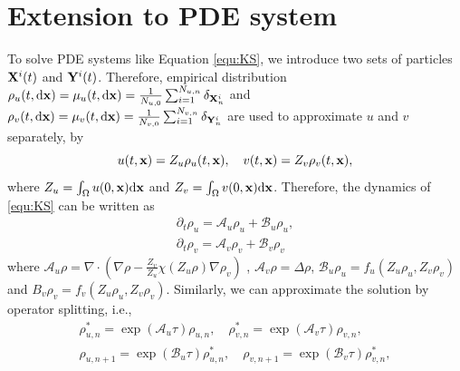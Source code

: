 \documentclass[a4paper,fleqn]{cas-sc}
\theoremstyle{definition}
\theoremstyle{remark}
\begin{document}
\section{Extension to PDE system}
\label{sec:extension}
To solve PDE systems like Equation \eqref{equ:KS}, we introduce two sets of particles $\mathbf{X}^i(t)$ and $\mathbf{Y}^i(t)$. Therefore, empirical distribution $\rho_u(t,\mathrm{d} \mathbf{x} ) = \mu_u(t,\mathrm{d} \mathbf{x}) =  \frac{1}{N_{u,0}}\sum_{i=1}^{N_{u,n}}\delta_{\mathbf{X}^i_n} $ and $\rho_v(t,\mathrm{d} \mathbf{x} ) = \mu_v(t,\mathrm{d} \mathbf{x}) =  \frac{1}{N_{v,0}}\sum_{i=1}^{N_{v,n}}\delta_{\mathbf{Y}^i_n}$ are used to approximate $u$ and $v$ separately, by 
\begin{equation}
    u(t,\mathbf{x}) =  Z_u \rho_u(t,\mathbf{x}), \quad v(t,\mathbf{x}) =  Z_v \rho_v(t,\mathbf{x}),
\end{equation}
where $Z_u = \int_\Omega u(0,\mathbf{x}) \mathrm{d} \mathbf{x}$ and $Z_v = \int_\Omega v(0,\mathbf{x}) \mathrm{d} \mathbf{x}$. Therefore, the dynamics of \eqref{equ:KS} can be written as 
\begin{equation}
    \begin{aligned}
        \partial_t \rho_u =  \mathcal A_u \rho_u + \mathcal B_u \rho_u,\\
        \partial_t \rho_v =  \mathcal A_v \rho_v + \mathcal B_v \rho_v
    \end{aligned}
\end{equation}
where $\mathcal A_u \rho = \nabla \cdot ( \nabla \rho - \frac{Z_v}{Z_u} \chi(Z_u\rho) \nabla \rho_v)$ , $\mathcal A_v \rho = \Delta \rho$, $\mathcal B_u \rho_u  = f_u(Z_u\rho_u,Z_v \rho_v)$ and $B_v \rho_v = f_v(Z_u\rho_u,Z_v \rho_v)$. Similarly, we can approximate the solution by operator splitting, i.e., 
\begin{equation}
    \begin{aligned}
        \rho_{u,n}^*  =  \exp(\mathcal A_u\tau) \rho_{u,n}, \quad 
         \rho_{v,n}^*  =  \exp(\mathcal A_v\tau) \rho_{v,n},  \\
         \rho_{u,n+1} =  \exp(\mathcal B_u\tau) \rho_{u,n}^*,  \quad 
         \rho_{v,n+1}  =  \exp(\mathcal B_v\tau) \rho_{v,n}^*,   \\
    \end{aligned}
\end{equation}
\end{document}
